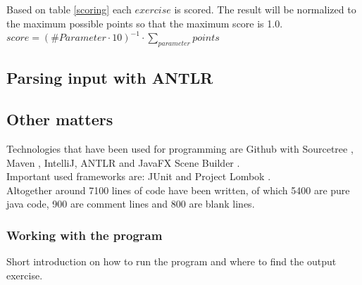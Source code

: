 \noindent Based on table \ref{scoring} each $exercise$ is scored.
The result will be normalized to the maximum possible points so that the maximum score is 1.0.\\
$score = (\#Parameter\cdot10)^{-1}\cdot\sum\limits_{parameter}^{}points$

\pagebreak
\subsection{Parsing input with ANTLR}







\subsection{Other matters}

Technologies that have been used for programming are Github \cite{github} with Sourcetree \cite{sourcetree}, Maven \cite{maven}, IntelliJ\cite{intellij}, ANTLR \cite{antlr} and JavaFX Scene Builder \cite{scenebuilder}. \\
Important used frameworks are: JUnit \cite{junit} and Project Lombok \cite{lombok}.\\
Altogether around 7100 lines of code have been written, of which 5400 are pure java code, 900 are comment lines and 800 are blank lines.\\

\subsubsection{Working with the program}
Short introduction on how to run the program and where to find the output exercise.
\pagebreak